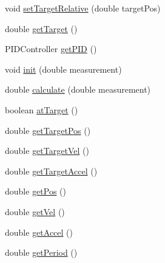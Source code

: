 \begin{DoxyCompactItemize}
void \mbox{\hyperlink{classfrc_1_1robot_1_1controller_1_1_linear_profiler_adc5f6e012d51900b577649e28782c68c}{set\+Target\+Relative}} (double target\+Pos)
\item 
double \mbox{\hyperlink{classfrc_1_1robot_1_1controller_1_1_linear_profiler_ae733ba3bc770615eb3b279552dbf2ec3}{get\+Target}} ()
\item 
P\+I\+D\+Controller \mbox{\hyperlink{classfrc_1_1robot_1_1controller_1_1_linear_profiler_a0a836468baaa6205b3cd5242944e5e6a}{get\+P\+ID}} ()
\item 
void \mbox{\hyperlink{classfrc_1_1robot_1_1controller_1_1_linear_profiler_a566952c2ffea68f7a162df009ca930cb}{init}} (double measurement)
\item 
double \mbox{\hyperlink{classfrc_1_1robot_1_1controller_1_1_linear_profiler_aae4b5ac2aad7a19d4e632739b85ed93d}{calculate}} (double measurement)
\item 
boolean \mbox{\hyperlink{classfrc_1_1robot_1_1controller_1_1_linear_profiler_ae81e47754ae53ca675d73b45fb1cf200}{at\+Target}} ()
\item 
double \mbox{\hyperlink{classfrc_1_1robot_1_1controller_1_1_linear_profiler_a71e277bb2b69e59aada090b08f951356}{get\+Target\+Pos}} ()
\item 
double \mbox{\hyperlink{classfrc_1_1robot_1_1controller_1_1_linear_profiler_a8fcc148becac735bffb55e36cd84a245}{get\+Target\+Vel}} ()
\item 
double \mbox{\hyperlink{classfrc_1_1robot_1_1controller_1_1_linear_profiler_a6ec4d0e47566bf616433da403b19b52a}{get\+Target\+Accel}} ()
\item 
double \mbox{\hyperlink{classfrc_1_1robot_1_1controller_1_1_linear_profiler_a8cca4cf7ff15dbe94743b0fdd144bde0}{get\+Pos}} ()
\item 
double \mbox{\hyperlink{classfrc_1_1robot_1_1controller_1_1_linear_profiler_a6dd5cb0cfb1335c0d156bd4a57ed3f92}{get\+Vel}} ()
\item 
double \mbox{\hyperlink{classfrc_1_1robot_1_1controller_1_1_linear_profiler_a0bfafea6b9a9c4eb9d30f2c1214d86db}{get\+Accel}} ()
\item 
double \mbox{\hyperlink{classfrc_1_1robot_1_1controller_1_1_linear_profiler_ab713bb7047183a7ef960afc396bcc6ce}{get\+Period}} ()
\end{DoxyCompactItemize}
